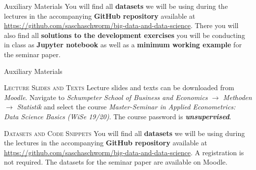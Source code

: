 \documentclass[document.tex]{subfiles}
\begin{document}
    \iffom
    \begin{frame}{Auxiliary Materials}
        You will find all \textbf{datasets} we will be using during the lectures in the accompanying \textbf{GitHub repository} available at \href{https://github.com/saschaschworm/big-data-and-data-science}{https://github.com/saschaschworm/big-data-and-data-science}. There you will also find all \textbf{solutions to the development exercises} you will be conducting in class as \textbf{Jupyter notebook} as well as a \textbf{minimum working example} for the seminar paper.
    \end{frame}
    \else
    \begin{frame}{Auxiliary Materials}
        \begin{alertblock}{\textsc{Lecture Slides and Texts}}
            \vspace*{-.1mm}
            Lecture slides and texts can be downloaded from \textit{Moodle}. Navigate to \textit{Schumpeter School of Business and Economics} $\rightarrow$ \textit{Methoden} $\rightarrow$ \textit{Statistik} and select the course \textit{Master-Seminar in Applied Econometrics: Data Science Basics (WiSe 19/20)}. The course password is \textit{\textbf{unsupervised}}.
        \end{alertblock}
        
        \begin{alertblock}{\textsc{Datasets and Code Snippets}}
            \vspace*{-.1mm}            
            You will find all \textbf{datasets} we will be using during the lectures in the accompanying \textbf{GitHub repository} available at \href{https://github.com/saschaschworm/big-data-and-data-science}{https://github.com/saschaschworm/big-data-and-data-science}. A registration is not required. The datasets for the seminar paper are available on Moodle.
        \end{alertblock}
    \end{frame}
    \fi
    
\end{document}
